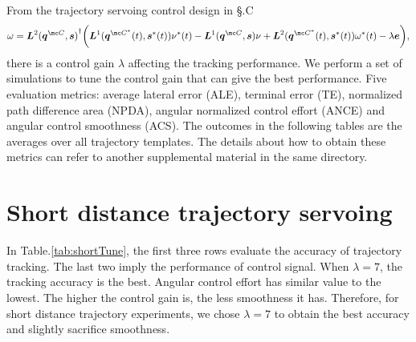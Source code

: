 \documentclass[11pt]{article}
\newcommand{\TODO}[1]{\textcolor{red}{[TODO: #1]}}
\begin{document}
\newcommand{\RomanNumeralCaps}[1]
    {\MakeUppercase{\romannumeral #1}}

\newcommand{\imJacV}{\boldsymbol{L}}
\newcommand{\pointSetV}{\boldsymbol{q}}
\newcommand{\featSetV}{\boldsymbol{s}}
\newcommand{\featSetDV}{\boldsymbol{s}^*}
\newcommand{\error}{\boldsymbol{e}}

From the trajectory servoing control design in \S \RomanNumeralCaps{2}.C
\begin{equation} \label{eq:IBVStrajTrack}
  \omega = {\imJacV^2(\pointSetV^{\mc C},\featSetV)}^\dagger
    \bigg( \imJacV^1(\pointSetV^{\mc C^*}(t),\featSetDV(t)) \nu^* {(t)} 
          -\imJacV^1(\pointSetV^{\mc C},\featSetV) \nu
      + \imJacV^2(\pointSetV^{\mc C^*}(t),\featSetDV(t)) \omega^* {(t)}
      - \lambda \error \bigg),
\end{equation}
there is a control gain $\lambda$ affecting the tracking performance. 
We perform a set of simulations to tune the control gain that can give the 
best performance.
Five evaluation metrics: average lateral error (ALE), terminal error (TE), 
normalized path difference area (NPDA), 
angular normalized control effort (ANCE) and angular control smoothness (ACS).
The outcomes in the following tables are the averages over 
all trajectory templates.
The details about how to obtain these metrics can refer to another supplemental 
material in the same directory.


\section{Short distance trajectory servoing}\label{sec:short}

In Table.\ref{tab:shortTune}, the first three rows evaluate the accuracy of 
trajectory tracking. The last two imply the performance of control signal.
When $\lambda=7$, the tracking accuracy is the best. Angular control effort 
has similar value to the lowest. The higher the control gain is, the less 
smoothness it has.
Therefore, for short distance trajectory experiments, 
we chose $\lambda=7$ to obtain the best accuracy 
and slightly sacrifice smoothness.
\end{document}
